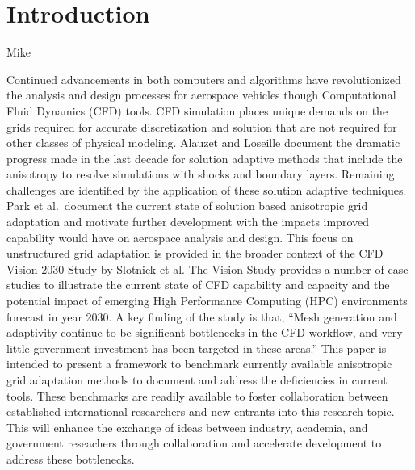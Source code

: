 \documentclass[3p,times,procedia,number]{elsarticle}
\begin{document}



\section{Introduction}
{\color{red} Mike}

Continued advancements in both computers and algorithms 
have revolutionized the analysis and design processes for
aerospace vehicles though Computational Fluid Dynamics (CFD) tools.
CFD simulation places unique demands on the grids required for
accurate discretization and solution that are not required
for other classes of physical modeling.
Alauzet and Loseille\cite{alauzet-loseille-decade-aniso-adapt-cfd}
document the dramatic progress made in the last decade
for solution adaptive methods that include the anisotropy to
resolve simulations with shocks and boundary layers.
Remaining challenges are identified
by the application of these solution adaptive techniques.
Park et al.\cite{park-unstruct-adapt-status-cfd2030}~document
the current state of solution based anisotropic
grid adaptation and motivate further development with 
the impacts improved capability would have on
aerospace analysis and design.
This focus on unstructured grid adaptation
is provided in the broader context of the 
CFD Vision 2030 Study by Slotnick et al.\cite{cfd-vision-2030}
The Vision Study provides a number of case studies
to illustrate the current state of CFD capability and capacity and the
potential impact of emerging High Performance Computing (HPC)
environments forecast in year 2030.
A key finding of the study is that, 
``Mesh generation and adaptivity continue to be significant bottlenecks
in the CFD workflow, and very little government investment has been targeted
in these areas.''\cite{cfd-vision-2030}
This paper is intended to present a framework to benchmark
currently available anisotropic grid adaptation methods 
to document and address the deficiencies in current tools.
These benchmarks are readily available to foster collaboration
between established international researchers and new
entrants into this research topic.
This will enhance the exchange of ideas between
industry, academia, and government reseachers through collaboration
and accelerate development to address these bottlenecks.
\end{document}
